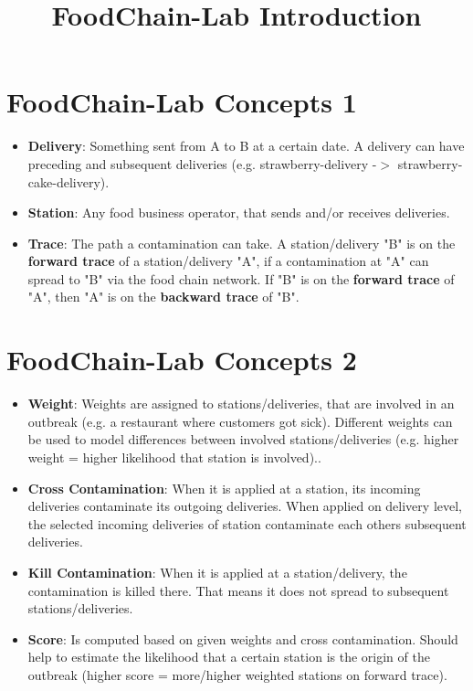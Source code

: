 \documentclass{beamer}
\title{FoodChain-Lab Introduction}
\date{}
\begin{document}
\maketitle

\section{FoodChain-Lab Concepts 1}
\begin{frame}
	\begin{itemize}
		\item \textbf{Delivery}: Something sent from A to B at a certain date. A delivery can have preceding and subsequent deliveries (e.g. strawberry-delivery -$>$ strawberry-cake-delivery).
		\item \textbf{Station}: Any food business operator, that sends and/or receives deliveries.
		\item \textbf{Trace}: The path a contamination can take. A station/delivery "B" is on the \textbf{forward trace} of a station/delivery "A", if a contamination at "A" can spread to "B" via the food chain network. If "B" is on the \textbf{forward trace} of "A", then "A" is on the \textbf{backward trace} of "B".
	\end{itemize}
\end{frame}

\section{FoodChain-Lab Concepts 2}
\begin{frame}
	\begin{itemize}
		\item \textbf{Weight}: Weights are assigned to stations/deliveries, that are involved in an outbreak (e.g. a restaurant where customers got sick). Different weights can be used to model differences between involved stations/deliveries (e.g. higher weight = higher likelihood that station is involved)..
		\item \textbf{Cross Contamination}: When it is applied at a station, its incoming deliveries contaminate its outgoing deliveries. When applied on delivery level, the selected incoming deliveries of station contaminate each others subsequent deliveries.
		\item \textbf{Kill Contamination}: When it is applied at a station/delivery, the contamination is killed there. That means it does not spread to subsequent stations/deliveries.
		\item \textbf{Score}: Is computed based on given weights and cross contamination. Should help to estimate the likelihood that a certain station is the origin of the outbreak (higher score = more/higher weighted stations on forward trace).
	\end{itemize}
\end{frame}
\end{document}
